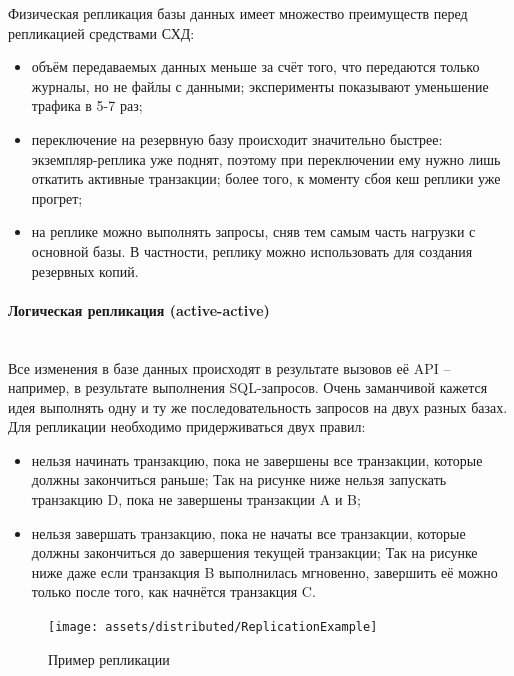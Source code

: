 Физическая репликация базы данных имеет множество преимуществ перед репликацией средствами СХД:
\begin{itemize}
    \item объём передаваемых данных меньше за счёт того, что передаются только журналы, но не файлы с данными; эксперименты показывают уменьшение трафика в 5-7 раз;
    \item переключение на резервную базу происходит значительно быстрее: экземпляр-реплика уже поднят, поэтому при переключении ему нужно лишь откатить активные транзакции; более того, к моменту сбоя кеш реплики уже прогрет;
    \item на реплике можно выполнять запросы, сняв тем самым часть нагрузки с основной базы. В частности, реплику можно использовать для создания резервных копий.
\end{itemize}

\paragraph{Логическая репликация (active-active)} ~\\
Все изменения в базе данных происходят в результате вызовов её API – например, в результате выполнения SQL-запросов.
Очень заманчивой кажется идея выполнять одну и ту же последовательность запросов на двух разных базах. Для репликации
необходимо придерживаться двух правил:
\begin{itemize}
    \item нельзя начинать транзакцию, пока не завершены все транзакции, которые должны закончиться раньше; Так на рисунке ниже нельзя запускать транзакцию D, пока не завершены транзакции A и B;
    \item нельзя завершать транзакцию, пока не начаты все транзакции, которые должны закончиться до завершения текущей транзакции; Так на рисунке ниже даже если транзакция B выполнилась мгновенно, завершить её можно только после того, как начнётся транзакция C.
\end{itemize}

\begin{figure}[H]
    \centering
    \texttt{[image: assets/distributed/ReplicationExample]}
    \caption{Пример репликации}
    \label{fig:ReplicationExample}
\end{figure}

